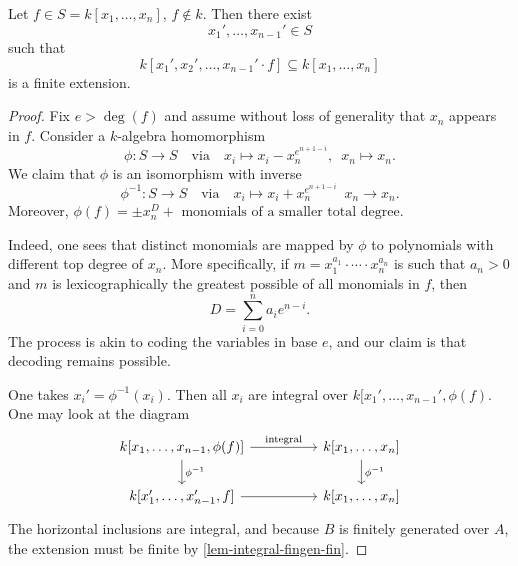 \begin{lemma}
  Let $f \in S = k[x_1, \dotsc, x_n]$, $f \notin k$. Then there exist \[x_1', \dotsc, x_{n-1}' \in S\] such that
  \[k[x_1', x_2', \dotsc, x_{n-1}' \cdot f] \subseteq k[x_1, \dotsc, x_n]\]
  is a finite extension.
\end{lemma}
\begin{proof}
  Fix $e > \deg(f)$ and assume without loss of generality that $x_n$ appears in $f$. Consider a $k$-algebra homomorphism
  \[ \phi \colon S \to S \quad \text{via} \quad x_i \mapsto x_i - x_n^{e^{n+1-i}}, \enspace x_n \mapsto x_n.\]
  We claim that $\phi$ is an isomorphism with inverse
  \[ \phi^{-1} \colon S \to S \quad \text{via} \quad x_i \mapsto x_i + x_n^{e^{n+1-i}} \enspace x_n \to x_n.\]
  Moreover, $\phi(f) = \pm x_n^D + \text{ monomials of a smaller total degree}$.

  Indeed, one sees that distinct monomials are mapped by $\phi$ to polynomials with different top degree of $x_n$. More specifically, if $m = x_1^{a_1} \cdot \dotsb \cdot x_n^{a_n}$ is such that $a_n > 0$ and $m$ is lexicographically the greatest possible of all monomials in $f$, then
  \[ D = \sum_{i=0}^n a_i e^{n-i}.\]
  The process is akin to coding the variables in base $e$, and our claim is that decoding remains possible.

  One takes $x_i' = \phi^{-1}(x_i)$. Then all $x_i$ are integral over $k[x_1', \dotsc, x_{n-1}', \phi(f)$. One may look at the diagram
  \[
  \begin{tikzcd}[column sep = huge]
    k[x_1, \dotsc, x_{n-1}, \phi(f)] \arrow{r}{\text{integral}} \arrow{d}{\phi^{-1}}
    & k[x_1, \dotsc, x_n] \arrow{d}{\phi^{-1}} \\
    k[x_1', \dotsc, x_{n-1}', f] \arrow{r}
    & k[x_1, \dotsc, x_n]
  \end{tikzcd}
  \]
  The horizontal inclusions are integral, and because $B$ is finitely generated over $A$, the extension must be finite by \cref{lem-integral-fingen-fin}.
\end{proof}

